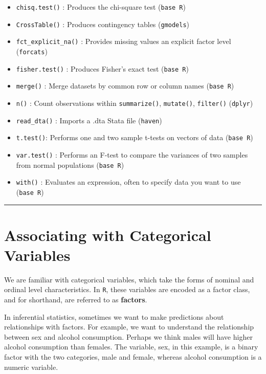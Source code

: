 \documentclass[
]{book}
\providecommand{\tightlist}{%
  \setlength{\itemsep}{0pt}\setlength{\parskip}{0pt}}
\begin{document}
\begin{itemize}
\tightlist
\item
  \texttt{chisq.test()} : Produces the chi-square test (\texttt{base\ R})
\item
  \texttt{CrossTable()} : Produces contingency tables (\texttt{gmodels})
\item
  \texttt{fct\_explicit\_na()} : Provides missing values an explicit factor level (\texttt{forcats})
\item
  \texttt{fisher.test()} : Produces Fisher's exact test (\texttt{base\ R})
\item
  \texttt{merge()} : Merge datasets by common row or column names (\texttt{base\ R})
\item
  \texttt{n()} : Count observations within \texttt{summarize()}, \texttt{mutate()}, \texttt{filter()} (\texttt{dplyr})
\item
  \texttt{read\_dta()} : Imports a .dta Stata file (\texttt{haven})
\item
  \texttt{t.test()}: Performs one and two sample t-tests on vectors of data (\texttt{base\ R})
\item
  \texttt{var.test()} : Performs an F-test to compare the variances of two samples from normal populations (\texttt{base\ R})
\item
  \texttt{with()} : Evaluates an expression, often to specify data you want to use (\texttt{base\ R})
\end{itemize}

\begin{center}\rule{0.5\linewidth}{0.5pt}\end{center}

\hypertarget{associating-with-categorical-variables}{%
\section{Associating with Categorical Variables}\label{associating-with-categorical-variables}}

We are familiar with categorical variables, which take the forms of nominal and ordinal level characteristics. In \texttt{R}, these variables are encoded as a factor class, and for shorthand, are referred to as \textbf{factors}.

In inferential statistics, sometimes we want to make predictions about relationships with factors. For example, we want to understand the relationship between sex and alcohol consumption. Perhaps we think males will have higher alcohol consumption than females. The variable, sex, in this example, is a binary factor with the two categories, male and female, whereas alcohol consumption is a numeric variable.
\end{document}
